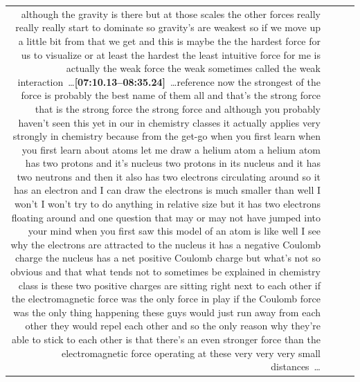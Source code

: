 \documentclass[10pt]{article}
\begin{document}
\begin{tiny}
\begin{longtable}{r p{0.3in} p{1.212in} p{3.8in}}
although the gravity is there but at those scales the other forces really really really start to dominate so gravity's are weakest so if we move up a little bit from that we get and this is maybe the the hardest force for us to visualize or at least the hardest the least intuitive force for me is actually the weak force the weak sometimes called the weak interaction~\ldots\smallskip\newline\textbf{[07:10.13--08:35.24]}~\ldots reference now the strongest of the force is probably the best name of them all and that's the strong force that is the strong force the strong force and although you probably haven't seen this yet in our in chemistry classes it actually applies very strongly in chemistry because from the get-go when you first learn when you first learn about atoms let me draw a helium atom a helium atom has two protons and it's nucleus two protons in its nucleus and it has two neutrons and then it also has two electrons circulating around so it has an electron and I can draw the electrons is much smaller than well I won't I won't try to do anything in relative size but it has two electrons floating around and one question that may or may not have jumped into your mind when you first saw this model of an atom is like well I see why the electrons are attracted to the nucleus it has a negative Coulomb charge the nucleus has a net positive Coulomb charge but what's not so obvious and that what tends not to sometimes be explained in chemistry class is these two positive charges are sitting right next to each other if the electromagnetic force was the only force in play if the Coulomb force was the only thing happening these guys would just run away from each other they would repel each other and so the only reason why they're able to stick to each other is that there's an even stronger force than the electromagnetic force operating at these very very very small distances~\ldots \\

\end{longtable}
\end{tiny}
\end{document}
